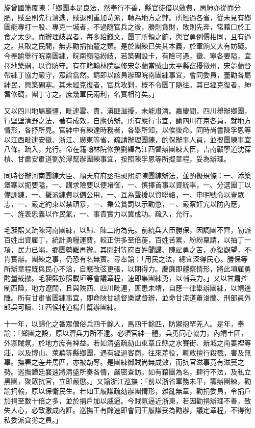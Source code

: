 \begin{pinyinscope}
旋曾國籓覆陳：「鄉團本是良法，然奉行不善，縣官徒借以斂費，局紳亦從而分肥，賊至則先行潰逃，賊退則重加苛派，轉為地方之弊。所經過各省，從未見有鄉團能專打一股、專克一城者，不過隨官兵之後，勝則貪財，敗則先奔，常藉口於工食之太少。而辦理歧異者，每多給錢文，團丁所領之餉，與官勇例價相同，且有過之。其取之民間，無非勸捐抽釐之類。是於團練已失其本義，於軍餉又大有妨礙。今奉諭舉行皖南團練，皖南嶺隘紛歧，若築碉設卡，有險可憑，徽、寧各要隘，宜擇地築碉，以資防守。有在籍翰林院編修宋夢蘭當賊由太平縣竄擾徽州，宋夢蘭督帶練丁協力嚴守，眾論翕然。請即以該員辦理皖南團練事宜，會同委員，董勸各屬紳民，興築碉塞。其未經克復者，官兵攻剿，概不令團丁隨往。其已經克復者，紳耆修碉，團丁守之。庶幾軍民兩利，名實相符矣。」

又以四川地屬巖疆，毗連雲、貴，滇匪滋擾，未能肅清。嘉慶間，四川舉辦鄉團，行堅壁清野之法，著有成效，自應仿辦。所有應行事宜，諭四川在京各員，就地方情形，各抒所見。官紳中有練達時務者，各舉所知，以俟後命。同時尚書陳孚恩等以江西毗連安徽、浙江、廣東等省，疏請辦理團練，酌保辦事人員，並擬團練事宜八條。疏入，允行。命在籍翰林院修撰劉繹為江西督辦團練大臣，吉南贛寧道沈葆楨、甘肅安肅道劉於潯幫辦團練事宜，按照陳孚恩等所擬章程，妥為辦理。

同時督辦河南團練大臣、順天府府丞毛昶熙疏陳團練辦法，並酌擬規條：一、添築堡寨以扼要隘，一、講求險要以便堵御，一、慎擇首事以資統率，一、分選團丁以備訓練，一、攤派練費以備公用，一、互為聲援以資聯絡，一、申明號令以壹眾志，一、嚴定約束以禁頑暴，一、秉公賞罰以示勸懲，一、嚴察奸宄以防內應，一、旌表忠義以作民氣，一、事貴實力以冀成功。疏入，允行。

毛昶熙又疏陳河南團練，以歸、陳二府為先。前統兵大臣勝保，因調團不齊，勒派百姓出資雇丁，統計勇糧運費，較正供多至倍蓰，百姓苦累，紛紛稟請，以抽丁一項，民力已竭，鄉團勢難再辦。其開封等府百姓聞歸、陳雇勇之苦，亦復觀望，不肯實辦。團練之事，仍恐有名無實。尋奉諭：「用民之法，總宜深得民心。勝保等所辦章程既與民心不洽，自應改弦更張，以期得力。慶廉即體察情形，將此項雇勇酌量裁撤。毛昶熙按照載垣等會議章程，速即集團練勇，以輔兵力。」又以甘肅控制西陲，地方遼闊，且與陜西、四川毗連，匪患未靖，自應一律舉辦團練，以靖邊陲。所有甘肅省團練事宜，即命陜甘總督樂斌督辦，並命甘涼道蕭浚蘭、刑部員外郎吳可讀、江西候補道楊升幫辦團練。

十一年，以歸化之番眾僧俗兵四千餘人，馬四千餘匹，防禦抱罕羌人。是年，奉諭：「鄉團之設，原以濟兵力所不逮。必須官紳一體，兵勇同心協力，內靖土匪，外禦賊氛，於地方庶有裨益。若如清盛疏劾山東章丘縣之水賽街、新城之南婁裡等莊，以及博山、萊蕪等縣鄉團，遇有經過客商，往來差役，輒敢擅行殺戮，害及無辜。撫署之差弁馬匹，亦被劫奪。是團練御賊尚無成效，而抗官滋事竟有滋蔓之勢。巡撫譚廷襄速將清盛所奏各情，嚴密查訪。如有藉團為名，肆行不法，及私立黑團，聚眾抗官，立即嚴懲。」又諭浙江巡撫：「前以浙省軍務未平，籌辦團練，勸諭捐輸，原以保衛民生。若如王履謙疏劾辦團情形，雜亂無章，勸捐委員，令捐戶加捐至數十倍之多，並於捐戶加以威逼。今賊氛逼近浙東，若因勸捐辦理不善，致失人心，必致激成內訌。巡撫王有齡速即會同王履謙妥為勸辦，議定章程，不得徇私委派貪劣之員。」


\end{pinyinscope}
